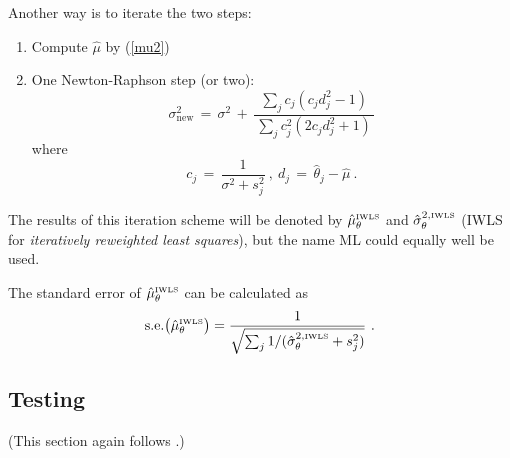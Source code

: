 \documentclass[a4paper,12pt,fleqn]{article}
\begin{document}
Another way is to iterate the two steps:
\begin{enumerate}
\item Compute $\hat\mu$ by (\ref{mu2})
\item One Newton-Raphson step (or two):
\begin{equation}
      \sigma^2_{\text{new}} \,=\, \sigma^2 \,+\,
        \frac{\sum_j c_j (c_j d_j^2 - 1)}
         { \, \sum_j c_j^2 (2 c_j d_j^2 + 1) \, }
\end{equation}
where
\[
  c_j \,=\, \frac{1}{\sigma^2 + s_j^2} \ , \
         d_j \,=\, \hat\theta_j - \hat\mu \ .
\]
\end{enumerate}

The results of this iteration scheme will be denoted by
${\hat{\mu}}_\theta^{\mbox{\tiny IWLS}}$ and
${\hat{\sigma}}_\theta^{2, \mbox{\tiny IWLS}}$
(IWLS for \emph{iteratively reweighted least squares}),
but the name ML could equally well be used.

The standard error
of  $\hat\mu_\theta^{\mbox{\tiny IWLS}}$ can be calculated as
\begin{equation}
 \mbox{s.e.}\big( {\hat{\mu}}_\theta^{\mbox{\tiny IWLS}} \big) =
     \frac {1}
     {\sqrt{ \sum_j 1/({\hat{\sigma}}^{2, \mbox{\tiny IWLS}}_\theta + s^2_j ) } } \ .  \label{se2}
\end{equation}

\subsection{Testing}

(This section again follows \citet{SnijdersBaerveldt03}.)
\end{document}
